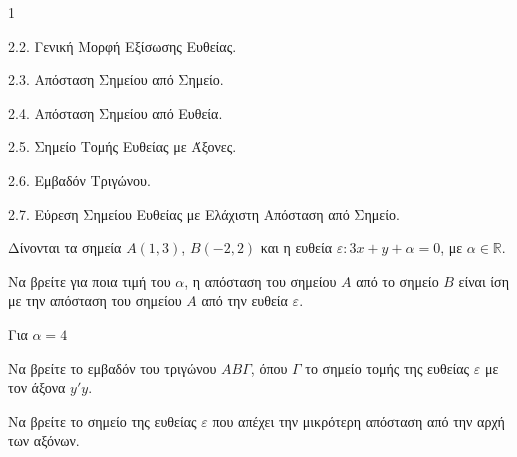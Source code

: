 \begin{ylh}{1}
    \item 2.2. Γενική Μορφή Εξίσωσης Ευθείας.
    \item 2.3. Απόσταση Σημείου από Σημείο.
    \item 2.4. Απόσταση Σημείου από Ευθεία.
    \item 2.5. Σημείο Τομής Ευθείας με Άξονες.
    \item 2.6. Εμβαδόν Τριγώνου.
    \item 2.7. Εύρεση Σημείου Ευθείας με Ελάχιστη Απόσταση από Σημείο.
\end{ylh}
Δίνονται τα σημεία $A(1,3)$, $B(-2,2)$ και η ευθεία $\varepsilon: 3x + y + \alpha = 0$, με $\alpha \in \mathbb{R}$.
\begin{alist}
\item Να βρείτε για ποια τιμή του $\alpha$, η απόσταση του σημείου $A$ από το σημείο $B$ είναι ίση με την απόσταση του σημείου $A$ από την ευθεία $\varepsilon$. 
\item Για $\alpha = 4$
    \begin{rlist}
    \item Να βρείτε το εμβαδόν του τριγώνου $AB\Gamma$, όπου $\Gamma$ το σημείο τομής της ευθείας $\varepsilon$ με τον άξονα $y'y$. 
    \item Να βρείτε το σημείο της ευθείας $\varepsilon$ που απέχει την μικρότερη απόσταση από την αρχή των αξόνων. 
    \end{rlist}
\end{alist}